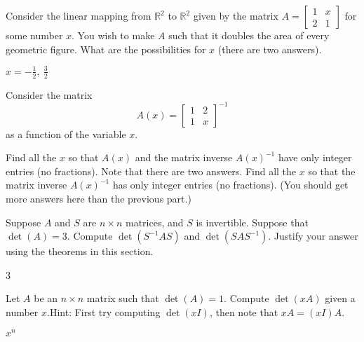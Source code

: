 \begin{exercise}
Consider the linear mapping from ${\mathbb R}^2$ to ${\mathbb R}^2$
given by the  matrix
$A = \left[ \begin{smallmatrix}
1 & x \\
2 & 1
\end{smallmatrix} \right]$
for some number $x$.  You wish to make $A$ such that it doubles the area of
every geometric figure.  What are the possibilities for $x$ (there are two
answers).
\end{exercise}
\comboSol{%
}
{%
$x = -\frac{1}{2},\ \frac{3}{2}$
}

\begin{exercise}[challenging]\ansMark%
Consider the matrix
\begin{equation*}
A(x) = \begin{bmatrix}
1 & 2 \\ 1 & x
\end{bmatrix}^{-1}
\end{equation*}
as a function of the variable $x$.
\begin{tasks}
\task Find all the $x$ so that $A(x)$ and the matrix inverse $A(x)^{-1}$
have only integer entries (no fractions). Note that there are two answers.
\task Find all the $x$ so that the matrix inverse $A(x)^{-1}$
has only integer entries (no fractions). (You should get more answers here than the previous part.)
\end{tasks}

\end{exercise}

\begin{exercise}
Suppose $A$ and $S$ are $n \times n$ matrices, and $S$ is invertible.
Suppose that $\det(A) = 3$.  Compute $\det(S^{-1}AS)$ and 
$\det(SAS^{-1})$.  Justify your answer using the theorems in this section.
\end{exercise}
\comboSol{%
}
{%
3
}

\begin{exercise}
Let $A$ be an $n \times n$ matrix such that $\det(A)=1$.
Compute $\det(x A)$ given a number $x$.\linebreak[2]
Hint: First try computing
$\det(xI)$, then note that $xA = (xI)A$.
\end{exercise}
\comboSol{%
}
{%
$x^n$
}

\setcounter{exercise}{100}







